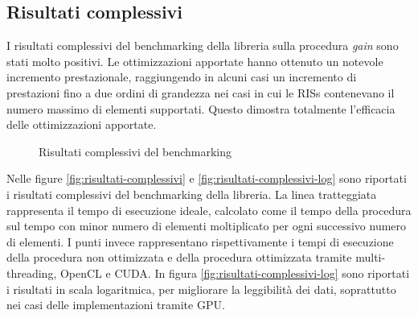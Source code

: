 \subsection{Risultati complessivi}
\label{subsec:risultati-complessivi}

I risultati complessivi del benchmarking della libreria sulla procedura \textit{gain}
sono stati molto positivi. Le ottimizzazioni apportate hanno ottenuto un notevole
incremento prestazionale, raggiungendo in alcuni casi un incremento di
prestazioni fino a due ordini di grandezza nei casi in cui le RISs contenevano
il numero massimo di elementi supportati. Questo dimostra totalmente l'efficacia
delle ottimizzazioni apportate.

\begin{figure}[!ht]
  \centering
  \caption{Risultati complessivi del benchmarking}
\end{figure}

Nelle figure \ref{fig:risultati-complessivi} e
\ref{fig:risultati-complessivi-log} sono riportati i risultati complessivi del
benchmarking della libreria. La linea tratteggiata rappresenta il tempo di esecuzione
ideale, calcolato come il tempo della procedura sul tempo con minor numero di
elementi moltiplicato per ogni successivo numero di elementi. I punti invece rappresentano
rispettivamente i tempi di esecuzione della procedura non ottimizzata e della procedura
ottimizzata tramite multi-threading, OpenCL e CUDA. In figura \ref{fig:risultati-complessivi-log}
sono riportati i risultati in scala logaritmica, per migliorare la leggibilità
dei dati, soprattutto nei casi delle implementazioni tramite GPU.

